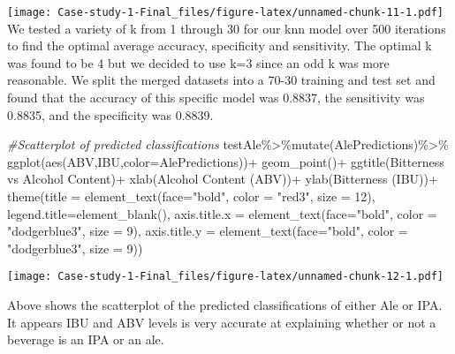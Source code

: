 \documentclass[
]{article}
\newenvironment{Shaded}{\begin{snugshade}}{\end{snugshade}}
\newcommand{\AttributeTok}[1]{\textcolor[rgb]{0.77,0.63,0.00}{#1}}
\newcommand{\CommentTok}[1]{\textcolor[rgb]{0.56,0.35,0.01}{\textit{#1}}}
\newcommand{\DecValTok}[1]{\textcolor[rgb]{0.00,0.00,0.81}{#1}}
\newcommand{\FunctionTok}[1]{\textcolor[rgb]{0.00,0.00,0.00}{#1}}
\newcommand{\NormalTok}[1]{#1}
\newcommand{\SpecialCharTok}[1]{\textcolor[rgb]{0.00,0.00,0.00}{#1}}
\newcommand{\StringTok}[1]{\textcolor[rgb]{0.31,0.60,0.02}{#1}}
\begin{document}
\texttt{[image: Case-study-1-Final\_files/figure-latex/unnamed-chunk-11-1.pdf]}
We tested a variety of k from 1 through 30 for our knn model over 500
iterations to find the optimal average accuracy, specificity and
sensitivity. The optimal k was found to be 4 but we decided to use k=3
since an odd k was more reasonable. We split the merged datasets into a
70-30 training and test set and found that the accuracy of this specific
model was 0.8837, the sensitivity was 0.8835, and the specificity was
0.8839.

\begin{Shaded}
\begin{Highlighting}[]
\CommentTok{\#Scatterplot of predicted classifications}
\NormalTok{testAle}\SpecialCharTok{\%\textgreater{}\%}\FunctionTok{mutate}\NormalTok{(AlePredictions)}\SpecialCharTok{\%\textgreater{}\%}
  \FunctionTok{ggplot}\NormalTok{(}\FunctionTok{aes}\NormalTok{(ABV,IBU,}\AttributeTok{color=}\NormalTok{AlePredictions))}\SpecialCharTok{+}
  \FunctionTok{geom\_point}\NormalTok{()}\SpecialCharTok{+}
  \FunctionTok{ggtitle}\NormalTok{(}\StringTok{\textquotesingle{}Bitterness vs Alcohol Content\textquotesingle{}}\NormalTok{)}\SpecialCharTok{+}
  \FunctionTok{xlab}\NormalTok{(}\StringTok{\textquotesingle{}Alcohol Content (ABV)\textquotesingle{}}\NormalTok{)}\SpecialCharTok{+}
  \FunctionTok{ylab}\NormalTok{(}\StringTok{\textquotesingle{}Bitterness (IBU)\textquotesingle{}}\NormalTok{)}\SpecialCharTok{+}
  \FunctionTok{theme}\NormalTok{(}\AttributeTok{title =} \FunctionTok{element\_text}\NormalTok{(}\AttributeTok{face=}\StringTok{"bold"}\NormalTok{, }\AttributeTok{color =} \StringTok{"red3"}\NormalTok{, }\AttributeTok{size =} \DecValTok{12}\NormalTok{),}
        \AttributeTok{legend.title=}\FunctionTok{element\_blank}\NormalTok{(),}
        \AttributeTok{axis.title.x =} \FunctionTok{element\_text}\NormalTok{(}\AttributeTok{face=}\StringTok{"bold"}\NormalTok{, }\AttributeTok{color =} \StringTok{"dodgerblue3"}\NormalTok{, }\AttributeTok{size =} \DecValTok{9}\NormalTok{),}
        \AttributeTok{axis.title.y =} \FunctionTok{element\_text}\NormalTok{(}\AttributeTok{face=}\StringTok{"bold"}\NormalTok{, }\AttributeTok{color =} \StringTok{"dodgerblue3"}\NormalTok{, }\AttributeTok{size =} \DecValTok{9}\NormalTok{))}
\end{Highlighting}
\end{Shaded}

\texttt{[image: Case-study-1-Final\_files/figure-latex/unnamed-chunk-12-1.pdf]}

Above shows the scatterplot of the predicted classifications of either
Ale or IPA. It appears IBU and ABV levels is very accurate at explaining
whether or not a beverage is an IPA or an ale.
\end{document}

